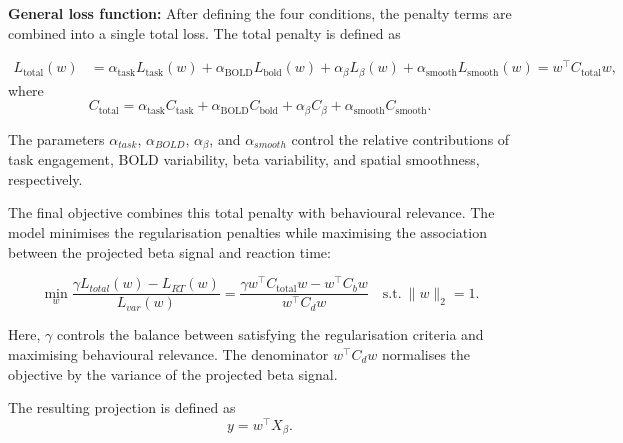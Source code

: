 \documentclass[utf8]{frontiers_suppmat}
\begin{document}
\textbf{General loss function:} After defining the four conditions, the penalty terms are combined into a single total loss. The total penalty is defined as

\begin{align}
L_{\mathrm{total}}(w)
&= \alpha_{\mathrm{task}} L_{\mathrm{task}}(w) + \alpha_{\mathrm{BOLD}} L_{\mathrm{bold}}(w) + \alpha_{\beta} L_{\beta}(w) + \alpha_{\mathrm{smooth}} L_{\mathrm{smooth}}(w)
\nonumber = w^\top C_{\mathrm{total}}w,
\end{align}
where
\begin{equation}
C_{\mathrm{total}}
= \alpha_{\mathrm{task}} C_{\mathrm{task}} + \alpha_{\mathrm{BOLD}} C_{\mathrm{bold}} + \alpha_{\beta} C_{\beta} + \alpha_{\mathrm{smooth}} C_{\mathrm{smooth}}.
\end{equation}

The parameters $\alpha_{task}$, $\alpha_{BOLD}$, $\alpha_{\beta}$, and $\alpha_{smooth}$ control the relative contributions of task engagement, BOLD variability, beta variability, and spatial smoothness, respectively.

The final objective combines this total penalty with behavioural relevance. The model minimises the regularisation penalties while maximising the association between the projected beta signal and reaction time:

\begin{equation}
\min_w
\frac{\gamma L_{total}(w) - L_{RT}(w)}{L_{var}(w)} = \frac{\gamma w^\top C_{\mathrm{total}}w - w^\top C_b w}{w^\top C_d w}
\quad
\mathrm{s.t.}\ \|w\|_2=1.
\end{equation}

Here, $\gamma$ controls the balance between satisfying the regularisation criteria and maximising behavioural relevance. The denominator $w^\top C_d w$ normalises the objective by the variance of the projected beta signal.

The resulting projection is defined as
\begin{equation}
y = w^\top X_{\beta}.
\end{equation}
\end{document}
